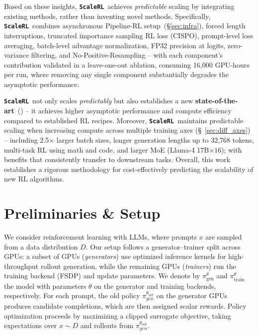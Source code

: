 \documentclass[]{fairmeta} %
\newcommand{\scalerl}{\texttt{\textbf{ScaleRL}}}
\begin{document}
Based on these insights, \scalerl\ achieves \emph{predictable} scaling by integrating existing methods, rather than inventing novel methods. Specifically, \scalerl\ combines asynchronous Pipeline-RL setup~(\S\ref{sec:infra}), forced length interruptions, truncated importance sampling RL loss (CISPO), prompt-level loss averaging, batch-level advantage normalization, FP32 precision at logits, zero-variance filtering, and No-Positive-Resampling -- with each component's contribution validated in a leave-one-out ablation, consuming 16,000 GPU-hours per run, where removing any single component substantially degrades the asymptotic performance.


\scalerl\ not only scales \emph{predictably} but also establishes a new \textbf{state-of-the-art}~() -- it achieves higher asymptotic performance and compute efficiency compared to established RL recipes.  Moreover, \scalerl\ maintains predictable scaling when increasing compute across multiple training axes (\S~\ref{sec:diff_axes}) -- including 2.5$\times$ larger batch sizes, longer generation lengths up to 32,768 tokens, multi-task RL using math and code, and larger MoE (Llama-4 17B$\times16$); with benefits that consistently transfer to downstream tasks. Overall, this work establishes a rigorous methodology for cost-effectively predicting the scalability of new RL algorithms. 
\section{Preliminaries \& Setup}
\label{sec:methodology}

We consider reinforcement learning with LLMs, where prompts $x$ are sampled from a data distribution $D$. 
Our setup follows a generator–trainer split across GPUs: a subset of GPUs (\emph{generators}) use optimized inference kernels for high-throughput rollout generation, while the remaining GPUs (\emph{trainers}) run the training backend (FSDP) and update parameters. 
We denote by $\pi_{\text{gen}}^\theta$ and $\pi_{\text{train}}^\theta$ the model with parameters $\theta$ on the generator and training backends, respectively. 
For each prompt, the old policy $\pi_{gen}^{\theta_{old}}$ on the generator GPUs produces candidate completions, which are then assigned scalar rewards. 
Policy optimization proceeds by maximizing a clipped surrogate objective, taking expectations over $x \sim D$ and rollouts from $\pi_{gen}^{\theta_{old}}$.
\end{document}
